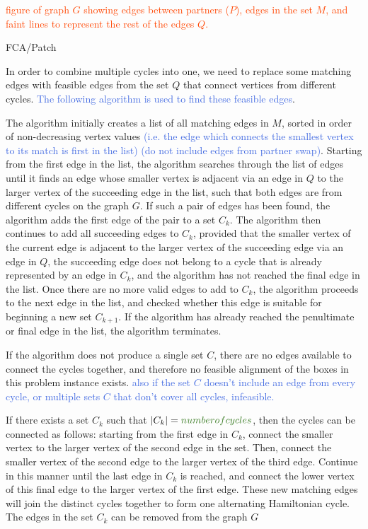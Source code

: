 \documentclass[oribibl]{llncs}
\begin{document}
\textcolor{OrangeRed}{figure of graph $G$ showing edges between partners ($P$), edges in the set $M$, and faint lines to represent the rest of the edges $Q$.}


FCA/Patch

In order to combine multiple cycles into one, we need to replace some matching edges with feasible edges from the set $Q$ that connect vertices from different cycles. \textcolor{RoyalBlue}{The following algorithm is used to find these feasible edges}.

The algorithm initially creates a list of all matching edges in $M$, sorted in order of non-decreasing vertex values \textcolor{RoyalBlue}{(i.e. the edge which connects the smallest vertex to its match is first in the list) (do not include edges from partner swap)}. Starting from the first edge in the list, the algorithm searches through the list of edges until it finds an edge whose smaller vertex is adjacent via an edge in $Q$ to the larger vertex of the succeeding edge in the list, such that both edges are from different cycles on the graph $G$. If such a pair of edges has been found, the algorithm adds the first edge of the pair to a set $C_k$. The algorithm then continues to add all succeeding edges to $C_k$, provided that the smaller vertex of the current edge is adjacent to the larger vertex of the succeeding edge via an edge in $Q$, the succeeding edge does not belong to a cycle that is already represented by an edge in $C_k$, and the algorithm has not reached the final edge in the list. Once there are no more valid edges to add to $C_k$, the algorithm proceeds to the next edge in the list, and checked whether this edge is suitable for beginning a new set $C_{k+1}$. If the algorithm has already reached the penultimate or final edge in the list, the algorithm terminates.

If the algorithm does not produce a single set $C$, there are no edges available to connect the cycles together, and therefore no feasible alignment of the boxes in this problem instance exists. \textcolor{RoyalBlue}{also if the set $C$ doesn't include an edge from every cycle, or multiple sets $C$ that don't cover all cycles, infeasible.}

If there exists a set $C_k$ such that $|C_k| = \textcolor{OliveGreen}{number of cycles}$, then the cycles can be connected as follows: starting from the first edge in $C_k$, connect the smaller vertex to the larger vertex of the second edge in the set. Then, connect the smaller vertex of the second edge to the larger vertex of the third edge. Continue in this manner until the last edge in $C_k$ is reached, and connect the lower vertex of this final edge to the larger vertex of the first edge. These new matching edges will join the distinct cycles together to form one alternating Hamiltonian cycle. The edges in the set $C_k$ can be removed from the graph $G$
\end{document}
